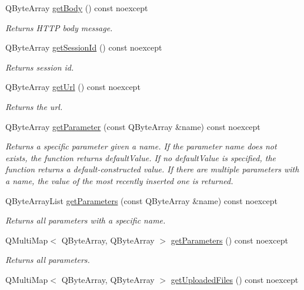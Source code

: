 \begin{DoxyCompactItemize}
Q\+Byte\+Array \hyperlink{class_http_parser_a730d8fa411954d674f602aa385869751}{get\+Body} () const noexcept
\begin{DoxyCompactList}\small\item\em Returns H\+T\+TP body message. \end{DoxyCompactList}\item 
Q\+Byte\+Array \hyperlink{class_http_parser_ad2c849df15ec861fca8911c0519747ae}{get\+Session\+Id} () const noexcept
\begin{DoxyCompactList}\small\item\em Returns session id. \end{DoxyCompactList}\item 
Q\+Byte\+Array \hyperlink{class_http_parser_a4fe7e2b589ec377ae0632d12c0db2109}{get\+Url} () const noexcept
\begin{DoxyCompactList}\small\item\em Returns the url. \end{DoxyCompactList}\item 
Q\+Byte\+Array \hyperlink{class_http_parser_aec19aa9b28449ed359dd0e516f24f3c4}{get\+Parameter} (const Q\+Byte\+Array \&name) const noexcept
\begin{DoxyCompactList}\small\item\em Returns a specific parameter given a name. If the parameter name does not exists, the function returns default\+Value. If no default\+Value is specified, the function returns a default-\/constructed value. If there are multiple parameters with a name, the value of the most recently inserted one is returned. \end{DoxyCompactList}\item 
Q\+Byte\+Array\+List \hyperlink{class_http_parser_aa0df65d83e9bdb39a6a667d55de1b742}{get\+Parameters} (const Q\+Byte\+Array \&name) const noexcept
\begin{DoxyCompactList}\small\item\em Returns all parameters with a specific name. \end{DoxyCompactList}\item 
Q\+Multi\+Map$<$ Q\+Byte\+Array, Q\+Byte\+Array $>$ \hyperlink{class_http_parser_a98e85a16d456f61fa032c8d3d9a8c1ba}{get\+Parameters} () const noexcept
\begin{DoxyCompactList}\small\item\em Returns all parameters. \end{DoxyCompactList}\item 
Q\+Multi\+Map$<$ Q\+Byte\+Array, Q\+Byte\+Array $>$ \hyperlink{class_http_parser_abbb9bc6fdfbc6f40629d2f8033c9f17f}{get\+Uploaded\+Files} () const noexcept

\end{DoxyCompactItemize}
